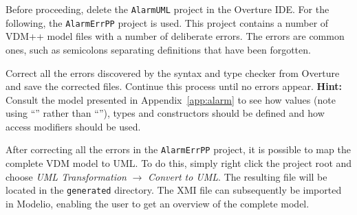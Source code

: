 
%

Before proceeding, delete the \texttt{AlarmUML} project in the Overture IDE. For the following, the \texttt{AlarmErrPP} project is used. This project contains a number of VDM++ model files with a number of deliberate errors.  The errors are common ones, such as semicolons separating definitions that have been forgotten.

\begin{myexercise}\label{ex:type-errors}
Correct all the errors discovered by the syntax and type checker from
Overture and save the corrected files. Continue this process until no errors appear.
\textbf{Hint:} Consult the model presented in
Appendix~\ref{app:alarm}
to see how values (note using ``\vdmstyle{=}'' rather than
``\vdmstyle{:=}''), types and constructors should be defined and how
access modifiers should be used.
\end{myexercise}


After correcting all the errors in the \texttt{AlarmErrPP} project, it is possible to map the complete VDM model to UML. To do this, simply right click the project root and choose \emph{UML Transformation} $\rightarrow $ \emph{Convert to UML}. The resulting file will be located in the \texttt{generated} directory.  The XMI file can subsequently be
imported in Modelio, enabling the user to get an overview of the complete model.

